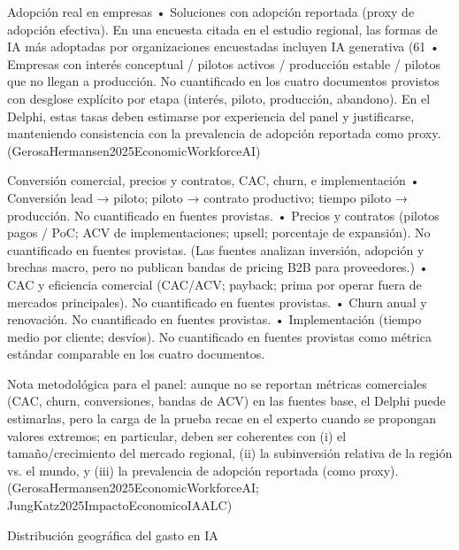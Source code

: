 \begin{APACode}
Adopción real en empresas
	•	Soluciones con adopción reportada (proxy de adopción efectiva). En una encuesta citada en el estudio regional, las formas de IA más adoptadas por organizaciones encuestadas incluyen IA generativa (61%
	•	Empresas con interés conceptual / pilotos activos / producción estable / pilotos que no llegan a producción. No cuantificado en los cuatro documentos provistos con desglose explícito por etapa (interés, piloto, producción, abandono). En el Delphi, estas tasas deben estimarse por experiencia del panel y justificarse, manteniendo consistencia con la prevalencia de adopción reportada como proxy. (GerosaHermansen2025EconomicWorkforceAI)

Conversión comercial, precios y contratos, CAC, churn, e implementación
	•	Conversión lead → piloto; piloto → contrato productivo; tiempo piloto → producción. No cuantificado en fuentes provistas.
	•	Precios y contratos (pilotos pagos / PoC; ACV de implementaciones; upsell; porcentaje de expansión). No cuantificado en fuentes provistas. (Las fuentes analizan inversión, adopción y brechas macro, pero no publican bandas de pricing B2B para proveedores.)
	•	CAC y eficiencia comercial (CAC/ACV; payback; prima por operar fuera de mercados principales). No cuantificado en fuentes provistas.
	•	Churn anual y renovación. No cuantificado en fuentes provistas.
	•	Implementación (tiempo medio por cliente; desvíos). No cuantificado en fuentes provistas como métrica estándar comparable en los cuatro documentos.

Nota metodológica para el panel: aunque no se reportan métricas comerciales (CAC, churn, conversiones, bandas de ACV) en las fuentes base, el Delphi puede estimarlas, pero la carga de la prueba recae en el experto cuando se propongan valores extremos; en particular, deben ser coherentes con (i) el tamaño/crecimiento del mercado regional, (ii) la subinversión relativa de la región vs. el mundo, y (iii) la prevalencia de adopción reportada (como proxy). (GerosaHermansen2025EconomicWorkforceAI; JungKatz2025ImpactoEconomicoIAALC)

Distribución geográfica del gasto en IA


\end{APACode}
